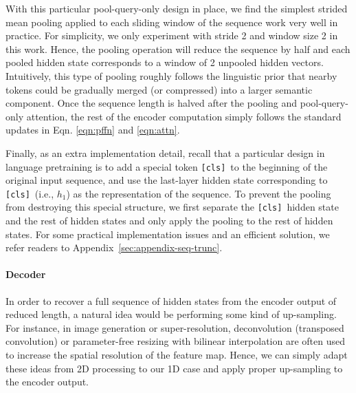 \documentclass{article}
\theoremstyle{custom}
\newcommand{\cls}{\texttt{[cls]}~}
\begin{document}
With this particular pool-query-only design in place, we find the simplest strided mean pooling applied to each sliding window of the sequence work very well in practice.
For simplicity, we only experiment with stride 2 and window size 2 in this work.
Hence, the pooling operation will reduce the sequence by half and each pooled hidden state corresponds to a window of 2 unpooled hidden vectors.
Intuitively, this type of pooling roughly follows the linguistic prior that nearby tokens could be gradually merged (or compressed) into a larger semantic component.
Once the sequence length is halved after the pooling and pool-query-only attention, the rest of the encoder computation simply follows the standard updates in Eqn. \eqref{eqn:pffn} and \eqref{eqn:attn}.

Finally, as an extra implementation detail, recall that a particular design in language pretraining is to add a special token \cls to the beginning of the original input sequence, and use the last-layer hidden state corresponding to \cls (i.e., $h_1$) as the representation of the sequence.
To prevent the pooling from destroying this special structure, we first separate the \cls hidden state and the rest of hidden states and only apply the pooling to the rest of hidden states.
For some practical implementation issues and an efficient solution, we refer readers to Appendix~\ref{sec:appendix-seq-trunc}.

\paragraph{Decoder} In order to recover a full sequence of hidden states from the encoder output of reduced length, a natural idea would be performing some kind of up-sampling.
For instance, in image generation or super-resolution, deconvolution (transposed convolution) or parameter-free resizing with bilinear interpolation are often used to increase the spatial resolution of the feature map.
Hence, we can simply adapt these ideas from 2D processing to our 1D case and apply proper up-sampling to the encoder output.
\end{document}
